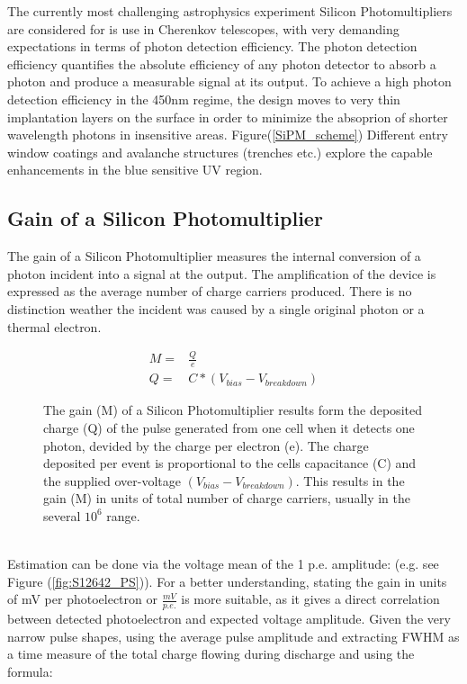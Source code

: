 \documentclass[article,type=msc,colorback,accentcolor=tud9c]{tudthesis}
\begin{document}
The currently most challenging astrophysics experiment Silicon Photomultipliers are considered for is use in Cherenkov telescopes, with very demanding expectations in terms of photon detection efficiency. The photon detection efficiency quantifies the absolute efficiency of any photon detector to absorb a photon and produce a measurable signal at its output. To achieve a high photon detection efficiency in the 450nm regime, the design moves to very thin implantation layers on the surface in order to minimize the absoprion of shorter wavelength photons in insensitive areas. Figure(\ref{SiPM_scheme}) Different entry window coatings and avalanche structures (trenches etc.) explore the capable enhancements in the blue sensitive UV region.

\newpage
\subsection{Gain of a Silicon Photomultiplier}
The gain of a Silicon Photomultiplier measures the internal conversion of a photon incident into a signal at the output. The amplification of the device is expressed as the average number of charge carriers produced. There is no distinction weather the incident was caused by a single original photon or a thermal electron.
\begin{figure}[h]
\begin{equation}
\begin{split}
M = & \frac{Q}{e} \\
Q = &  C * (V_{bias}-V_{breakdown})
\end{split}
\end{equation}
\label{eq:Gain_conversion_formula}
\caption{The gain (M) of a Silicon Photomultiplier results form the deposited charge (Q) of the pulse generated from one cell when it detects one photon, devided by the charge per electron (e). The charge deposited per event is proportional to the cells capacitance (C) and the supplied over-voltage $(V_{bias}-V_{breakdown})$. This results in the gain (M) in units of total number of charge carriers, usually in the several $10^6$ range.}
\end{figure}\\
Estimation can be done via the voltage mean of the 1 p.e. amplitude: (e.g. see Figure (\ref{fig:S12642_PS})). For a better understanding, stating the gain in units of mV per photoelectron or $\frac{mV}{p.e.}$ is more suitable, as it gives a direct correlation between detected photoelectron and expected voltage amplitude. Given the very narrow pulse shapes, using the average pulse amplitude and extracting FWHM as a time measure of the total charge flowing during discharge and using the formula:
\end{document}
